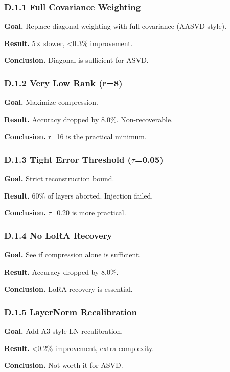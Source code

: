 \subsubsection{D.1.1 Full Covariance Weighting}

\textbf{Goal.} Replace diagonal weighting with full covariance (AASVD-style).

\textbf{Result.} 5$\times$ slower, <0.3\% improvement.

\textbf{Conclusion.} Diagonal is sufficient for ASVD.

\subsubsection{D.1.2 Very Low Rank (r=8)}

\textbf{Goal.} Maximize compression.

\textbf{Result.} Accuracy dropped by 8.0\%. Non-recoverable.

\textbf{Conclusion.} r=16 is the practical minimum.

\subsubsection{D.1.3 Tight Error Threshold ($\tau$=0.05)}

\textbf{Goal.} Strict reconstruction bound.

\textbf{Result.} 60\% of layers aborted. Injection failed.

\textbf{Conclusion.} $\tau$=0.20 is more practical.

\subsubsection{D.1.4 No LoRA Recovery}

\textbf{Goal.} See if compression alone is sufficient.

\textbf{Result.} Accuracy dropped by 8.0\%.

\textbf{Conclusion.} LoRA recovery is essential.

\subsubsection{D.1.5 LayerNorm Recalibration}

\textbf{Goal.} Add A3-style LN recalibration.

\textbf{Result.} <0.2\% improvement, extra complexity.

\textbf{Conclusion.} Not worth it for ASVD.


